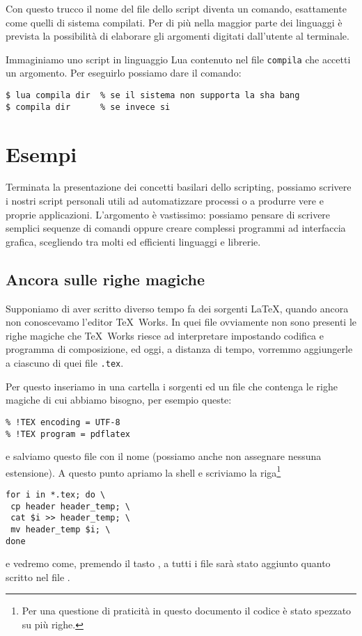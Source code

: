 Con questo trucco il nome del file dello script diventa un comando,
esattamente come quelli di sistema compilati. Per di più nella maggior parte
dei linguaggi è prevista la possibilità di elaborare gli argomenti digitati
dall'utente al terminale.

Immaginiamo uno script in linguaggio Lua contenuto nel file \texttt{compila}
che accetti un argomento. Per eseguirlo possiamo dare il comando:
\begin{Verbatim}
$ lua compila dir  % se il sistema non supporta la sha bang
$ compila dir      % se invece si
\end{Verbatim}

\section{Esempi}

Terminata la presentazione dei concetti basilari dello scripting, possiamo
scrivere i nostri script personali utili ad automatizzare processi o a produrre
vere e proprie applicazioni. L'argomento è vastissimo: possiamo pensare di
scrivere semplici sequenze di comandi oppure creare complessi programmi ad
interfaccia grafica, scegliendo tra molti ed efficienti linguaggi e librerie.

\subsection{Ancora sulle righe magiche}
\label{sssec:addheader}

Supponiamo di aver scritto diverso tempo fa dei sorgenti \LaTeX, quando ancora
non conoscevamo l'editor TeX~Works. In quei file ovviamente non sono presenti le
righe magiche che TeX~Works riesce ad interpretare impostando codifica e
programma di composizione, ed oggi, a distanza di tempo, vorremmo aggiungerle a
ciascuno di quei file \texttt{.tex}.

Per questo inseriamo in una cartella i sorgenti ed un file che contenga le
righe magiche di cui abbiamo bisogno, per esempio queste:
\begin{Verbatim}
% !TEX encoding = UTF-8
% !TEX program = pdflatex
\end{Verbatim}
e salviamo questo file con il nome  (possiamo anche non
assegnare nessuna estensione). A questo punto apriamo la shell e scriviamo la
riga\footnote{Per una questione di praticità in questo documento il codice è
stato spezzato su più righe.}
\begin{Verbatim}
for i in *.tex; do \
 cp header header_temp; \
 cat $i >> header_temp; \
 mv header_temp $i; \
done
\end{Verbatim}
e vedremo come, premendo il tasto \keys{\return}, a tutti i file sarà stato
aggiunto quanto scritto nel file .

